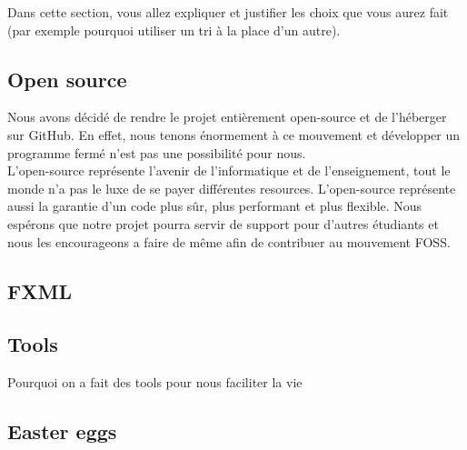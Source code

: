 \documentclass[../main.tex]{subfiles}
\begin{document}
Dans cette section, vous allez expliquer et justifier les choix que vous aurez fait (par exemple pourquoi utiliser un tri à la place d'un autre).

\subsection{Open source}
Nous avons décidé de rendre le projet entièrement open-source et de l'héberger sur GitHub. 
En effet, nous tenons énormement à ce mouvement et développer un programme fermé n'est pas une possibilité pour nous. \\

L'open-source représente l'avenir de l'informatique et de l'enseignement, tout le monde n'a pas le luxe de se payer différentes resources.
L'open-source représente aussi la garantie d'un code plus sûr, plus performant et plus flexible.
Nous espérons que notre projet pourra servir de support pour d'autres étudiants et nous les encourageons a faire de même 
afin de contribuer au mouvement FOSS.

\subsection{FXML}

\subsection{Tools}
Pourquoi on a fait des tools pour nous faciliter la vie

\subsection{Easter eggs}
\end{document}
